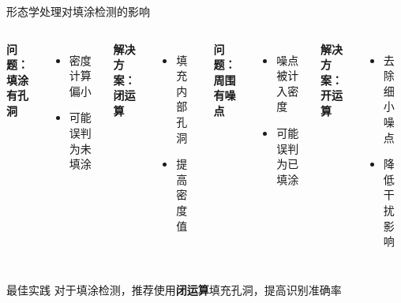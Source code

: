\begin{frame}{形态学处理对填涂检测的影响}
    \begin{columns}
        \textbf{问题：填涂有孔洞}
        \begin{itemize}
            \item 密度计算偏小
            \item 可能误判为未填涂
        \end{itemize}
        \vspace{0.2cm}
        \textbf{解决方案：闭运算}
        \begin{itemize}
            \item 填充内部孔洞
            \item 提高密度值
        \end{itemize}

        \textbf{问题：周围有噪点}
        \begin{itemize}
            \item 噪点被计入密度
            \item 可能误判为已填涂
        \end{itemize}
        \vspace{0.2cm}
        \textbf{解决方案：开运算}
        \begin{itemize}
            \item 去除细小噪点
            \item 降低干扰影响
        \end{itemize}
    \end{columns}

    \vspace{0.5cm}

    \begin{alertblock}{最佳实践}
    对于填涂检测，推荐使用\textbf{闭运算}填充孔洞，提高识别准确率
    \end{alertblock}
\end{frame}
